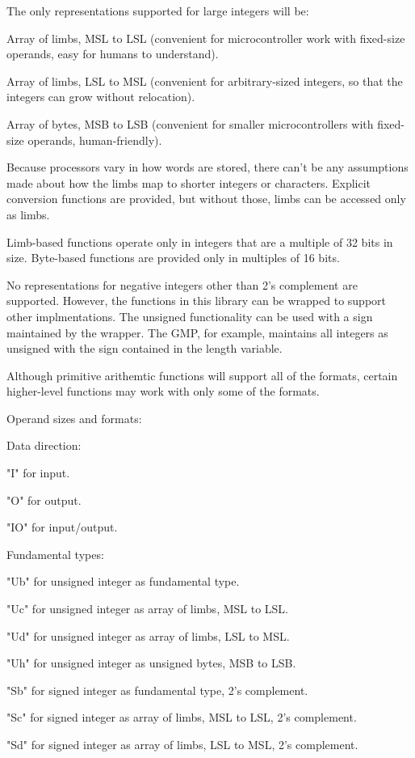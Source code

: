 The only representations supported for large integers will be:

Array of limbs, MSL to LSL (convenient for microcontroller work with fixed-size
operands, easy for humans to understand).

Array of limbs, LSL to MSL (convenient for arbitrary-sized integers, so that
the integers can grow without relocation).

Array of bytes, MSB to LSB (convenient for smaller microcontrollers with
fixed-size operands, human-friendly).

Because processors vary in how words are stored, there can't be any
assumptions made about how the limbs map to shorter integers or characters.
Explicit conversion functions are provided, but without those, limbs can
be accessed only as limbs.

Limb-based functions operate only in integers that are a multiple of
32 bits in size. Byte-based functions are provided only in multiples of 16 bits.

No representations for negative integers other than 2's complement are
supported. However, the functions in this library can be wrapped to support
other implmentations. The unsigned functionality can be used with a sign
maintained by the wrapper. The GMP, for example, maintains all integers as
unsigned with the sign contained in the length variable.

Although primitive arithemtic functions will support all of the formats,
certain higher-level functions may work with only some of the formats.

Operand sizes and formats:

Data direction:

"I" for input.

"O" for output.

"IO" for input/output.

Fundamental types:

"Ub" for unsigned integer as fundamental type.

"Uc" for unsigned integer as array of limbs, MSL to LSL.

"Ud" for unsigned integer as array of limbs, LSL to MSL.

"Uh" for unsigned integer as unsigned bytes, MSB to LSB.

"Sb" for signed integer as fundamental type, 2's complement.

"Sc" for signed integer as array of limbs, MSL to LSL, 2's complement.

"Sd" for signed integer as array of limbs, LSL to MSL, 2's complement.

